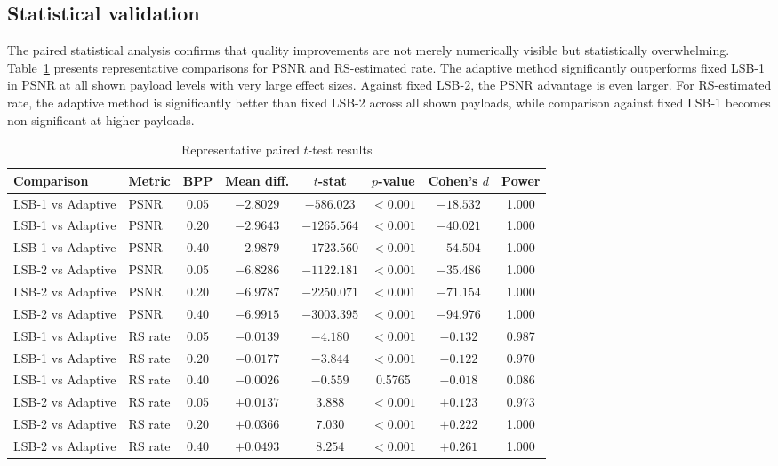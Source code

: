 \subsection{Statistical validation}
The paired statistical analysis confirms that quality improvements are not merely numerically visible but statistically overwhelming. Table~\ref{tab:stats} presents representative comparisons for PSNR and RS-estimated rate. The adaptive method significantly outperforms fixed LSB-1 in PSNR at all shown payload levels with very large effect sizes. Against fixed LSB-2, the PSNR advantage is even larger. For RS-estimated rate, the adaptive method is significantly better than fixed LSB-2 across all shown payloads, while comparison against fixed LSB-1 becomes non-significant at higher payloads.

\begin{table}[H]
\centering
\caption{Representative paired \(t\)-test results}
\label{tab:stats}
\begin{adjustbox}{max width=\textwidth}
\begin{tabular}{llcccccc}
\toprule
Comparison & Metric & BPP & Mean diff. & \(t\)-stat & \(p\)-value & Cohen's \(d\) & Power \\
\midrule
LSB-1 vs Adaptive & PSNR & 0.05 & \(-2.8029\) & \(-586.023\) & \(<0.001\) & \(-18.532\) & 1.000 \\
LSB-1 vs Adaptive & PSNR & 0.20 & \(-2.9643\) & \(-1265.564\) & \(<0.001\) & \(-40.021\) & 1.000 \\
LSB-1 vs Adaptive & PSNR & 0.40 & \(-2.9879\) & \(-1723.560\) & \(<0.001\) & \(-54.504\) & 1.000 \\
LSB-2 vs Adaptive & PSNR & 0.05 & \(-6.8286\) & \(-1122.181\) & \(<0.001\) & \(-35.486\) & 1.000 \\
LSB-2 vs Adaptive & PSNR & 0.20 & \(-6.9787\) & \(-2250.071\) & \(<0.001\) & \(-71.154\) & 1.000 \\
LSB-2 vs Adaptive & PSNR & 0.40 & \(-6.9915\) & \(-3003.395\) & \(<0.001\) & \(-94.976\) & 1.000 \\
LSB-1 vs Adaptive & RS rate & 0.05 & \(-0.0139\) & \(-4.180\) & \(<0.001\) & \(-0.132\) & 0.987 \\
LSB-1 vs Adaptive & RS rate & 0.20 & \(-0.0177\) & \(-3.844\) & \(<0.001\) & \(-0.122\) & 0.970 \\
LSB-1 vs Adaptive & RS rate & 0.40 & \(-0.0026\) & \(-0.559\) & 0.5765 & \(-0.018\) & 0.086 \\
LSB-2 vs Adaptive & RS rate & 0.05 & \(+0.0137\) & \(3.888\) & \(<0.001\) & \(+0.123\) & 0.973 \\
LSB-2 vs Adaptive & RS rate & 0.20 & \(+0.0366\) & \(7.030\) & \(<0.001\) & \(+0.222\) & 1.000 \\
LSB-2 vs Adaptive & RS rate & 0.40 & \(+0.0493\) & \(8.254\) & \(<0.001\) & \(+0.261\) & 1.000 \\
\bottomrule
\end{tabular}
\end{adjustbox}
\end{table}

